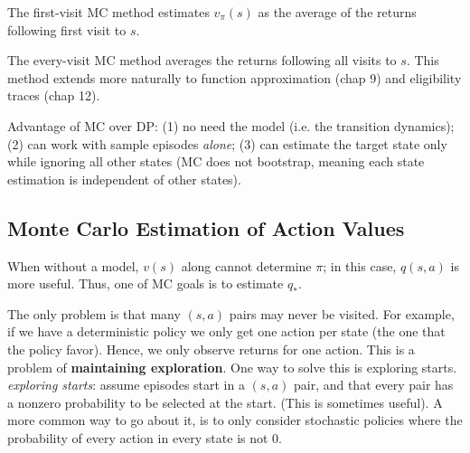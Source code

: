 \documentclass[lang=en,mode=geye,device=normal,color=blue,14pt]{elegantnote}
\DeclareMathOperator*{\1}{\mathbbm{1}}
\begin{document}
The first-visit MC method estimates $v_\pi (s)$ as the average of the returns following first visit to $s$.

The every-visit MC method averages the returns following all visits to $s$. This method extends more naturally to function approximation (chap 9) and eligibility traces (chap 12).

Advantage of MC over DP: (1) no need the model (i.e. the transition dynamics); (2) can work with sample episodes \textit{alone}; (3) can estimate the target state only while ignoring all other states (MC does not bootstrap, meaning each state estimation is independent of other states).

\subsection{Monte Carlo Estimation of Action Values}

When without a model, $v(s)$ along cannot determine $\pi$; in this case, $q(s,a)$ is more useful. Thus, one of MC goals is to estimate $q_*$.

The only problem is that many $(s,a)$ pairs may never be visited. For example, if we have a deterministic policy we only get one action per state (the one that the policy favor). Hence, we only observe returns for one action. This is a problem of \textbf{maintaining exploration}.
One way to solve this is exploring starts.
\textit{exploring starts}: assume episodes start in a $(s,a)$ pair, and that every pair has a nonzero probability to be selected at the start. (This is sometimes useful). A more common way to go about it, is to only consider stochastic policies where the probability of every action in every state is not 0.
\end{document}
